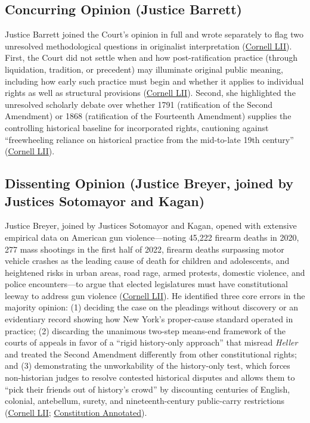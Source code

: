 \documentclass[12pt]{article}
\begin{document}
\subsection{Concurring Opinion (Justice Barrett)}

Justice Barrett joined the Court's opinion in full and wrote separately to flag two unresolved methodological questions in originalist interpretation (\href{https://www.law.cornell.edu/supremecourt/text/20-843}{Cornell LII}). First, the Court did not settle when and how post-ratification practice (through liquidation, tradition, or precedent) may illuminate original public meaning, including how early such practice must begin and whether it applies to individual rights as well as structural provisions (\href{https://www.law.cornell.edu/supremecourt/text/20-843}{Cornell LII}). Second, she highlighted the unresolved scholarly debate over whether 1791 (ratification of the Second Amendment) or 1868 (ratification of the Fourteenth Amendment) supplies the controlling historical baseline for incorporated rights, cautioning against ``freewheeling reliance on historical practice from the mid-to-late 19th century'' (\href{https://www.law.cornell.edu/supremecourt/text/20-843}{Cornell LII}).

\subsection{Dissenting Opinion (Justice Breyer, joined by Justices Sotomayor and Kagan)}

Justice Breyer, joined by Justices Sotomayor and Kagan, opened with extensive empirical data on American gun violence---noting 45,222 firearm deaths in 2020, 277 mass shootings in the first half of 2022, firearm deaths surpassing motor vehicle crashes as the leading cause of death for children and adolescents, and heightened risks in urban areas, road rage, armed protests, domestic violence, and police encounters---to argue that elected legislatures must have constitutional leeway to address gun violence (\href{https://www.law.cornell.edu/supremecourt/text/20-843}{Cornell LII}). He identified three core errors in the majority opinion: (1) deciding the case on the pleadings without discovery or an evidentiary record showing how New York's proper-cause standard operated in practice; (2) discarding the unanimous two-step means-end framework of the courts of appeals in favor of a ``rigid history-only approach'' that misread \textit{Heller} and treated the Second Amendment differently from other constitutional rights; and (3) demonstrating the unworkability of the history-only test, which forces non-historian judges to resolve contested historical disputes and allows them to ``pick their friends out of history's crowd'' by discounting centuries of English, colonial, antebellum, surety, and nineteenth-century public-carry restrictions (\href{https://www.law.cornell.edu/supremecourt/text/20-843}{Cornell LII}; \href{https://www.law.cornell.edu/constitution-conan/amendment-2/the-bruen-decision-and-concealed-carry-licenses}{Constitution Annotated}).
\end{document}
